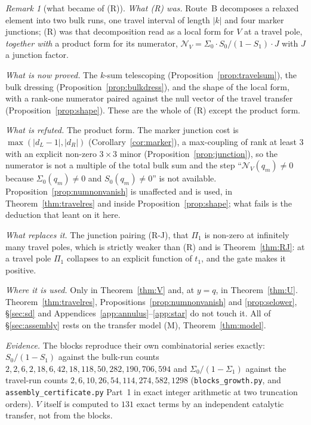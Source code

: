\documentclass[11pt]{article}
\theoremstyle{plain}
\theoremstyle{definition}
\theoremstyle{remark}
\newtheorem{remark}[theorem]{Remark}
\begin{document}
\begin{remark}[what became of \textup{(R)}]\label{rem:Rstatus}
\emph{What \textup{(R)} was.} Route~B decomposes a relaxed element into two bulk runs, one travel
interval of length $|k|$ and four marker junctions; \textup{(R)} was that decomposition read as a
local form for $V$ at a travel pole, \emph{together with} a product form for its numerator,
$\mathcal N_V=\Sigma_0\cdot S_0/(1-S_1)\cdot J$ with $J$ a junction factor.

\emph{What is now proved.} The $k$-sum telescoping (Proposition~\ref{prop:travelsum}), the bulk
dressing (Proposition~\ref{prop:bulkdress}), and the shape of the local form, with a rank-one
numerator paired against the null vector of the travel transfer
(Proposition~\ref{prop:shape}). These are the whole of \textup{(R)} except the product form.

\emph{What is refuted.} The product form. The marker junction cost is
$\max(|d_L-1|,|d_R|)$ (Corollary~\ref{cor:marker}), a max-coupling of rank at least $3$ with an explicit non-zero $3\times3$
minor (Proposition~\ref{prop:junction}), so the numerator is not a multiple of the total bulk sum
and the step ``$\mathcal N_V(q_m)\ne0$ because $\Sigma_0(q_m)\ne0$ and $S_0(q_m)\ne0$'' is not
available. Proposition~\ref{prop:numnonvanish} is unaffected and is used, in
Theorem~\ref{thm:travelres} and inside Proposition~\ref{prop:shape}; what fails is the deduction
that leant on it here.

\emph{What replaces it.} The junction pairing \textup{(R-J)}, that $\Pi_1$ is non-zero at
infinitely many travel poles, which is strictly weaker than \textup{(R)} and is
Theorem~\ref{thm:RJ}: at a travel pole $\Pi_1$ collapses to an explicit function of $t_1$, and the
gate makes it positive.

\emph{Where it is used.} Only in Theorem~\ref{thm:V} and, at $y=q$, in Theorem~\ref{thm:U}.
Theorem~\ref{thm:travelres}, Propositions~\ref{prop:numnonvanish} and \ref{prop:selower},
\S\ref{sec:sd} and Appendices~\ref{app:annulus}--\ref{app:star} do not touch it. All of
\S\ref{sec:assembly} rests on the transfer model \textup{(M)}, Theorem~\ref{thm:model}.

\emph{Evidence.} The blocks reproduce their own combinatorial series exactly: $S_0/(1-S_1)$
against the bulk-run counts $2,2,6,2,18,6,42,18,118,50,282,190,706,594$ and
$\Sigma_0/(1-\Sigma_1)$ against the travel-run counts $2,6,10,26,54,114,274,582,1298$
(\texttt{blocks\_growth.py}, and \texttt{assembly\_certificate.py} Part~1 in exact integer
arithmetic at two truncation orders). $V$ itself is computed to $131$ exact terms by an
independent catalytic transfer, not from the blocks.
\end{remark}
\end{document}
